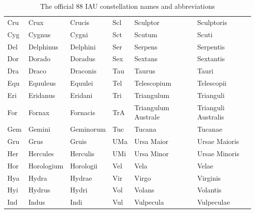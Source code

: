 \begin{table}[p]
\begin{tabular}{lll||lll}
Cru & Crux                 & Crucis                & Scl & Sculptor             & Sculptoris            \\
Cyg & Cygnus               & Cygni                 & Sct & Scutum               & Scuti                 \\
Del & Delphinus            & Delphini              & Ser & Serpens              & Serpentis             \\
Dor & Dorado               & Doradus               & Sex & Sextans              & Sextantis             \\
Dra & Draco                & Draconis              & Tau & Taurus               & Tauri                 \\
Equ & Equuleus             & Equulei               & Tel & Telescopium          & Telescopii            \\
Eri & Eridanus             & Eridani               & Tri & Triangulum           & Trianguli             \\
For & Fornax               & Fornacis              & TrA & Triangulum Australe  & Trianguli Australis   \\
Gem & Gemini               & Geminorum             & Tuc & Tucana               & Tucanae               \\
Gru & Grus                 & Gruis                 & UMa & Ursa Maior           & Ursae Maioris         \\
Her & Hercules             & Herculis              & UMi & Ursa Minor           & Ursae Minoris         \\
Hor & Horologium           & Horologii             & Vel & Vela                 & Velae                 \\
Hya & Hydra                & Hydrae                & Vir & Virgo                & Virginis              \\
Hyi & Hydrus               & Hydri                 & Vol & Volans               & Volantis              \\
Ind & Indus                & Indi                  & Vul & Vulpecula            & Vulpeculae            \\
\bottomrule
  \end{tabular}
  \caption{The official 88 IAU constellation names and abbreviations}
  \label{tab:IAUConstellations}
\end{table}

